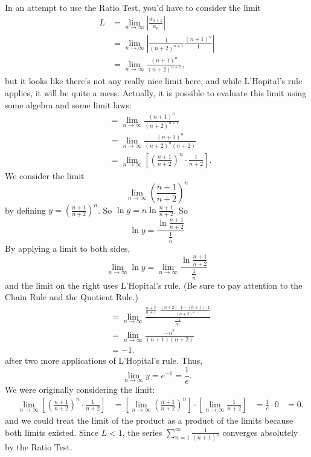 \documentclass{article}
\begin{document}
In an attempt to use the Ratio Test, you'd have to consider the limit
\begin{align*}
L&=\lim_{n \to \infty} \left|\frac{a_{n+1}}{a_n}\right|\\
&= \lim_{n \to \infty} \left| \frac{1}{(n+2)^{n+1}}\frac{(n+1)^n}{1}\right|\\
&= \lim_{n \to \infty} \frac{(n+1)^n}{(n+2)^{n+1}},
\end{align*}
but it looks like there's not any really nice limit here, and while L'Hopital's rule applies, it will be quite a mess. Actually, it is possible to evaluate this limit using some algebra and some limit laws:
\begin{align*}
&= \lim_{n \to \infty} \frac{(n+1)^n}{(n+2)^{n+1}}\\
&= \lim_{n \to \infty} \frac{(n+1)^n}{(n+2)^n(n+2)}\\
&= \lim_{n \to \infty} \left[\left(\frac{n+1}{n+2}\right)^n \cdot \frac1{n+2}\right].
\end{align*}
We consider the limit 
\[\lim_{n \to \infty} \left(\frac{n+1}{n+2}\right)^n\]
by defining $y = \left(\frac{n+1}{n+2}\right)^n$. So $\ln y = n \ln \frac{n+1}{n+2}$. So
\[ \ln y = \frac{\ln \frac{n+1}{n+2}}{\frac1n}\]
By applying a limit to both sides,
\[ \lim_{n \to \infty}\ln y = \lim_{n \to \infty} \frac{\ln \frac{n+1}{n+2}}{\frac1n}\]
and the limit on the right uses L'Hopital's rule. (Be sure to pay attention to the Chain Rule and the Quotient Rule.)
\begin{align*}
&=\lim_{n \to \infty} \frac{ \frac{n+2}{n+1} \cdot \frac{(n+2)\cdot 1 - (n+1) \cdot 1}{(n+2)^2}}{\frac{-1}{n^2}}\\
&=\lim_{n \to \infty} \frac{-n^2}{(n+1)(n+2)}\\
&=-1.
\end{align*}
after two more applications of L'Hopital's rule. Thus, 
\[ \lim_{n \to \infty} y = e^{-1} = \frac1e.\]
We were originally considering the limit:
\begin{align*}
&\lim_{n \to \infty} \left[\left(\frac{n+1}{n+2}\right)^n \cdot \frac1{n+2}\right]
&= \left[ \lim_{n \to \infty} \left(\frac{n+1}{n+2}\right)^n \right] \cdot \left[\lim_{n \to \infty} \frac1{n+2}\right]
&= \frac1e \cdot 0
&= 0.
\end{align*}
and we could treat the limit of the product as a product of the limits because both limits existed. Since $L < 1$, the series  $\displaystyle \sum_{n=1}^\infty \frac{1}{(n+1)^n}$ converges absolutely by the Ratio Test.
\end{document}
